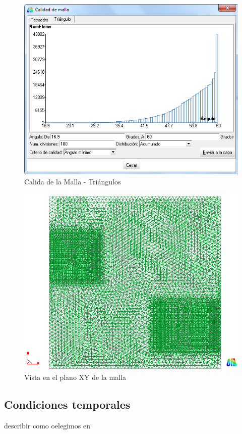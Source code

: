 \documentclass[10pt,a4paper,final]{article}
\begin{document}
\begin{figure}[tbhp]
\centerline{\includegraphics[scale=0.75]{img/cant_triangulos}}
\caption{Calida de la Malla - Triángulos}
\label{calidadtriangulos}
\end{figure}

\begin{figure}[tbhp]
\centerline{\includegraphics[scale=0.75]{img/contorno_malla_xy}}
\caption{Vista en el plano XY de la malla}
\label{contorno_malla_xy}
\end{figure}
%
\subsection{Condiciones temporales}
describir como oelegimos en
%
%
\end{document}
